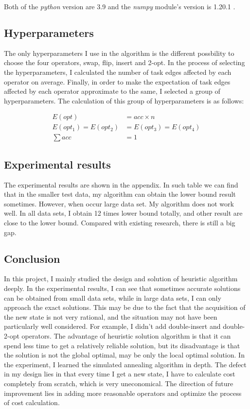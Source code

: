 \documentclass[conference,compsoc]{IEEEtran}
\begin{document}
Both of the \emph{python} version are 3.9 and the \emph{numpy} module's version is 1.20.1 .

\subsection{Hyperparameters}
The only hyperparameters I use in the algorithm is the different possbility to choose the four operators, swap, flip, insert and 2-opt. In the process of selecting the hyperparameters, I calculated the number of task edges affected by each operator on average. Finally, in order to make the expectation of task edges affected by each operator approximate to the same, I selected a group of hyperparameters. The calculation of this group of hyperparameters is as follows:

\begin{equation}
\begin{aligned}
E(opt)&=acc\times n\\
E(opt_1)=E(opt_2)&=E(opt_3)=E(opt_4)\\
\sum acc &= 1
\end{aligned}
\end{equation}


\subsection{Experimental results}
The experimental results are shown in the appendix. In such table we can find that in the smaller test data, my algorithm can obtain the lower bound result sometimes. However, when occur large data set. My algorithm does not work well. In all data sets, I obtain 12 times lower bound totally, and other result are close to the lower bound. Compared with existing research, there is still a big gap.


\subsection{Conclusion}
In this project, I mainly studied the design and solution of heuristic algorithm deeply. In the experimental results, I can see that sometimes accurate solutions can be obtained from small data sets, while in large data sets, I can only approach the exact solutions. This may be due to the fact that the acquisition of the new state is not very rational, and the situation may not have been particularly well considered. For example, I didn't add double-insert and double-2-opt operators. The advantage of heuristic solution algorithm is that it can spend less time to get a relatively reliable solution, but its disadvantage is that the solution is not the global optimal, may be only the local optimal solution. In the experiment, I learned the simulated annealing algorithm in depth. The defect in my design lies in that every time I get a new state, I have to calculate cost completely from scratch, which is very uneconomical. The direction of future improvement lies in adding more reasonable operators and optimize the process of cost calculation.
\end{document}
